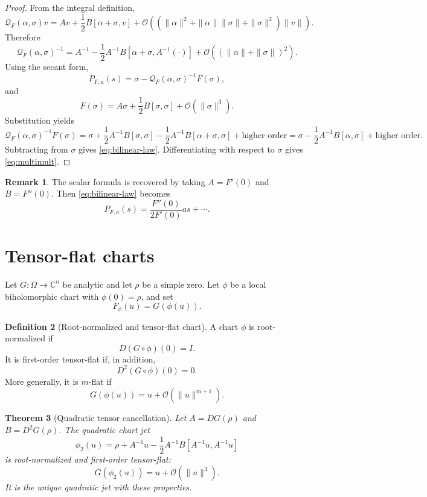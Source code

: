 \documentclass[11pt]{article}
\newtheorem{theorem}{Theorem}[section]
\theoremstyle{definition}
\newtheorem{definition}[theorem]{Definition}
\newtheorem{remark}[theorem]{Remark}
\newcommand{\C}{\mathbb C}
\newcommand{\Q}{\mathcal Q}
\newcommand{\Oterm}{\mathcal O}
\begin{document}
\begin{proof}
From the integral definition,
\[
\Q_F(\alpha,\sigma)v
=
Av+\frac12 B[\alpha+\sigma,v]
+\Oterm((\|\alpha\|^2+\|\alpha\|\|\sigma\|+\|\sigma\|^2)\|v\|).
\]
Therefore
\[
\Q_F(\alpha,\sigma)^{-1}
=
A^{-1}
-\frac12 A^{-1}B[\alpha+\sigma,A^{-1}(\cdot)]
+\Oterm((\|\alpha\|+\|\sigma\|)^2).
\]
Using the secant form,
\[
P_{F,a}(s)=\sigma-\Q_F(\alpha,\sigma)^{-1}F(\sigma),
\]
and
\[
F(\sigma)=A\sigma+\frac12 B[\sigma,\sigma]+\Oterm(\|\sigma\|^3).
\]
Substitution yields
\[
\Q_F(\alpha,\sigma)^{-1}F(\sigma)
=
\sigma+\frac12 A^{-1}B[\sigma,\sigma]
-\frac12 A^{-1}B[\alpha+\sigma,\sigma]+\text{higher order}
=
\sigma-\frac12 A^{-1}B[\alpha,\sigma]+\text{higher order}.
\]
Subtracting from $\sigma$ gives \eqref{eq:bilinear-law}. Differentiating with respect to $\sigma$ gives \eqref{eq:multimult}.
\end{proof}

\begin{remark}
The scalar formula is recovered by taking $A=F'(0)$ and $B=F''(0)$. Then \eqref{eq:bilinear-law} becomes
\[
P_{F,a}(s)=\frac{F''(0)}{2F'(0)}as+\cdots.
\]
\end{remark}

\section{Tensor-flat charts}

Let $G:\Omega\to\C^n$ be analytic and let $\rho$ be a simple zero. Let $\phi$ be a local biholomorphic chart with $\phi(0)=\rho$, and set
\[
F_\phi(u)=G(\phi(u)).
\]

\begin{definition}[Root-normalized and tensor-flat chart]
A chart $\phi$ is root-normalized if
\[
D(G\circ\phi)(0)=I.
\]
It is first-order tensor-flat if, in addition,
\[
D^2(G\circ\phi)(0)=0.
\]
More generally, it is $m$-flat if
\[
G(\phi(u))=u+\Oterm(\|u\|^{m+1}).
\]
\end{definition}

\begin{theorem}[Quadratic tensor cancellation]\label{thm:tensor-flat}
Let $A=DG(\rho)$ and $B=D^2G(\rho)$. The quadratic chart jet
\begin{equation}\label{eq:phi2}
\phi_2(u)=\rho+A^{-1}u-\frac12 A^{-1}B[A^{-1}u,A^{-1}u]
\end{equation}
is root-normalized and first-order tensor-flat:
\[
G(\phi_2(u))=u+\Oterm(\|u\|^3).
\]
It is the unique quadratic jet with these properties.
\end{theorem}
\end{document}
